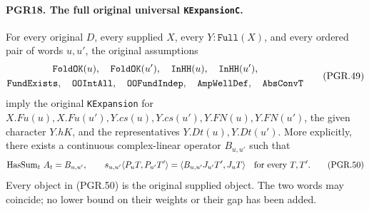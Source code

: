 \documentclass[11pt,a4paper]{article}
\numberwithin{equation}{section}
\theoremstyle{remark}\newtheorem{remark}[theorem]{Remark}
\begin{document}
\paragraph{PGR18. The full original universal \texttt{KExpansion\allowbreak C}.}
\label{claim:PGR18}
For every original \(D\), every supplied \(X\), every
\(Y:\texttt{Full}(X)\), and every ordered pair of words
\(u,u'\), the original assumptions
\[
 \begin{gathered}
 \texttt{Fold\allowbreak OK}(u),\quad\texttt{Fold\allowbreak OK}(u'),\quad
 \texttt{In\allowbreak HH}(u),\quad\texttt{In\allowbreak HH}(u'),\\
 \texttt{Fund\allowbreak Exists},\quad\texttt{OOInt\allowbreak All},\quad
 \texttt{OOFund\allowbreak Indep},\quad\texttt{Amp\allowbreak Well\allowbreak Def},\quad
 \texttt{Abs\allowbreak Conv\allowbreak T}
 \end{gathered}
\tag{PGR.49}
\]
imply the original \texttt{KExpansion} for
\(X.Fu(u),X.Fu(u'),Y.cs(u),Y.cs(u'),Y.FN(u),Y.FN(u')\),
the given character \(Y.hK\), and the representatives
\(Y.Dt(u),Y.Dt(u')\).  More explicitly, there exists a
continuous complex-linear operator \(B_{u,u'}\) such that
\[
 \operatorname{HasSum}_{t}\,A_t=B_{u,u'},\qquad
 s_{u,u'}\langle P_uT,P_{u'}T'\rangle
       =\langle B_{u,u'}J_{u'}T',J_uT\rangle
                                  \quad\hbox{for every }T,T'.
\tag{PGR.50}
\]
Every object in (PGR.50) is the original supplied object.  The two
words may coincide; no lower bound on their weights or their gap
has been added.
\end{document}
